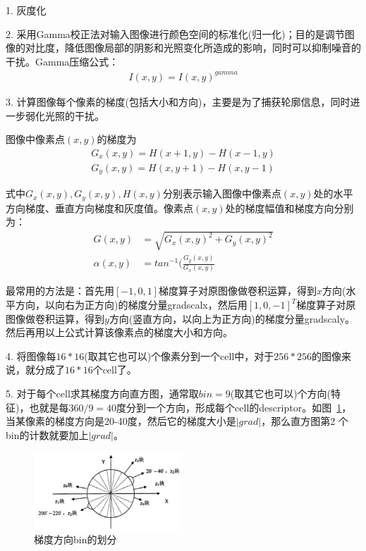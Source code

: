 \documentclass[12pt]{article}
\begin{document}
1. 灰度化

2. 采用Gamma校正法对输入图像进行颜色空间的标准化(归一化)；目的是调节图像的对比度，降低图像局部的阴影和光照变化所造成的影响，同时可以抑制噪音的干扰。Gamma压缩公式：
\begin{align}
I(x, y) = I(x, y)^{gamma}
\end{align}

3. 计算图像每个像素的梯度(包括大小和方向)，主要是为了捕获轮廓信息，同时进一步弱化光照的干扰。

图像中像素点$(x, y)$的梯度为
\begin{align}
G_x(x, y) = H(x+1, y) - H(x-1, y) \\
G_y(x, y) = H(x, y+1) - H(x, y-1)
\end{align}

式中$G_x(x, y), G_y(x, y), H(x, y)$分别表示输入图像中像素点$(x, y)$处的水平方向梯度、垂直方向梯度和灰度值。像素点$(x, y)$处的梯度幅值和梯度方向分别为：
\begin{align}
G(x, y) & = \sqrt{G_x(x, y)^2 + G_y(x, y)^2}\\
\alpha(x, y) & = tan^{-1}(\frac{G_y(x, y)}{G_x(x, y)}
\end{align}

最常用的方法是：首先用$[-1, 0, 1]$梯度算子对原图像做卷积运算，得到$x$方向(水平方向，以向右为正方向)的梯度分量gradscalx，然后用$[1, 0, -1]^T$梯度算子对原图像做卷积运算，得到$y$方向(竖直方向，以向上为正方向)的梯度分量gradscaly。然后再用以上公式计算该像素点的梯度大小和方向。

4. 将图像每$16*16$(取其它也可以)个像素分到一个cell中，对于$256*256$的图像来说，就分成了$16*16$个cell了。

5. 对于每个cell求其梯度方向直方图，通常取$bin = 9$(取其它也可以)个方向(特征)，也就是每$360/9 = 40$度分到一个方向，形成每个cell的descriptor。如图~\ref{fig: 方向梯度}，当某像素的梯度方向是20-40度，然后它的梯度大小是$|grad|$，那么直方图第2
个bin的计数就要加上$|grad|$。

\begin{figure}[!ht]
\centering
\includegraphics[width=0.5\textwidth]{方向梯度.png}
\caption{梯度方向bin的划分}
\label{fig: 方向梯度}
\end{figure} 
\end{document}
